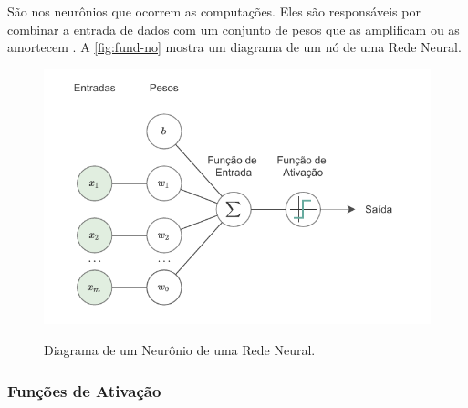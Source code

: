 São nos neurônios que ocorrem as computações. Eles são responsáveis por combinar a entrada de dados com um conjunto de pesos que as amplificam ou as amortecem \cite{ref:Nicholson}. A \autoref{fig:fund-no} mostra um diagrama de um nó de uma Rede Neural.

\begin{figure}[h!] %
  \centering
  \caption{Diagrama de um Neurônio de uma Rede Neural.}
  \includegraphics[scale=1.1]{img/img-fundamentacao-no.pdf}
  \label{fig:fund-no}
\end{figure}

\subsubsection{Funções de Ativação} \label{cap:fund-ia-rn-func}



